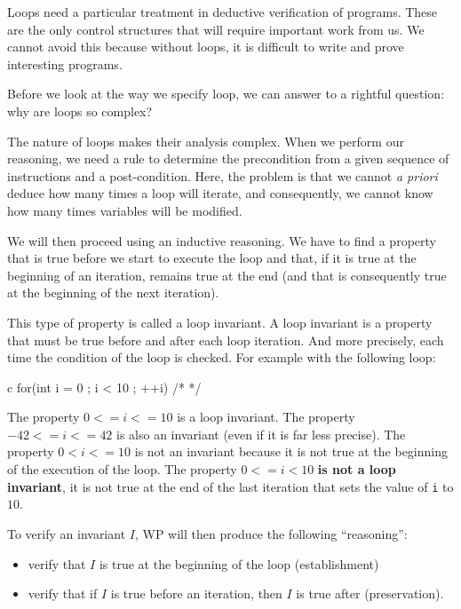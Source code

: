 Loops need a particular treatment in deductive verification of
programs. These are the only control structures that will require
important work from us. We cannot avoid this because without loops, it
is difficult to write and prove interesting programs.



Before we look at the way we specify loop, we can answer to a rightful
question: why are loops so complex?





The nature of loops makes their analysis complex. When we perform our
reasoning, we need a rule to determine the precondition from a given sequence
of instructions and a post-condition. Here, the problem is that we cannot
\emph{a priori} deduce how many times a loop will iterate, and consequently, we
cannot know how many times variables will be modified.



We will then proceed using an inductive reasoning. We have to find a
property that is true before we start to execute the loop and that, if
it is true at the beginning of an iteration, remains true at the end
(and that is consequently true at the beginning of the next iteration).



This type of property is called a loop invariant. A loop invariant is a
property that must be true before and after each loop iteration. And more
precisely, each time the condition of the loop is checked. For example with
the following loop:



\begin{CodeBlock}{c}
for(int i = 0 ; i < 10 ; ++i){ /* */ }
\end{CodeBlock}



The property $0 <= i <= 10$ is a loop invariant. The property
$-42 <= i <= 42$ is also an invariant (even if it is far less
precise). The property $0 < i <= 10$ is not an invariant because it is
not true at the beginning of the execution of the loop. The property
$0 <= i < 10$ \textbf{is not a loop invariant}, it is not true at the
end of the last iteration that sets the value of \texttt{i} to $10$.

To verify an invariant $I$, WP will then produce the following
``reasoning'':

\begin{itemize}
\item
  verify that $I$ is true at the beginning of the loop (establishment)
\item
  verify that if $I$ is true before an iteration, then $I$ is true
  after (preservation).
\end{itemize}

